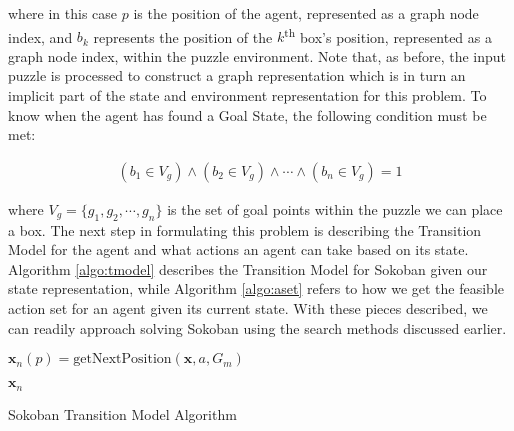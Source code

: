 \documentclass{article}[12pt]
\begin{document}
   where in this case $p$ is the position of the agent, represented as a graph node index, and $b_k$ represents the position of the $k$\textsuperscript{th} box's position, represented as a graph node index, within the puzzle environment. Note that, as before, the input puzzle is processed to construct a graph representation which is in turn an implicit part of the state and environment representation for this problem. To know when the agent has found a Goal State, the following condition must be met:
   
   \begin{align*}
   \left(b_1 \in V_g \right) \wedge \left(b_2 \in V_g \right) \wedge \cdots \wedge \left(b_n \in V_g \right) = 1
   \end{align*}
   
   where $V_g = \lbrace g_1, g_2, \cdots, g_n\rbrace$ is the set of goal points within the puzzle we can place a box. The next step in formulating this problem is describing the Transition Model for the agent and what actions an agent can take based on its state. Algorithm \ref{algo:tmodel} describes the Transition Model for Sokoban given our state representation, while Algorithm \ref{algo:aset} refers to how we get the feasible action set for an agent given its current state. With these pieces described, we can readily approach solving Sokoban using the search methods discussed earlier.
   
	\begin{algorithm}
		 \;
		 
		 \;
		 
		 $\boldsymbol{x}_n(p) =  \text{getNextPosition}\left(\boldsymbol{x},a,G_m\right)$
		 \;
		 \;
		 
		 \;
		 \Return $\boldsymbol{x}_n$
		 \caption{Sokoban Transition Model Algorithm}
		 \label{algo:tmodel}
	\end{algorithm}	
	
\end{document}
